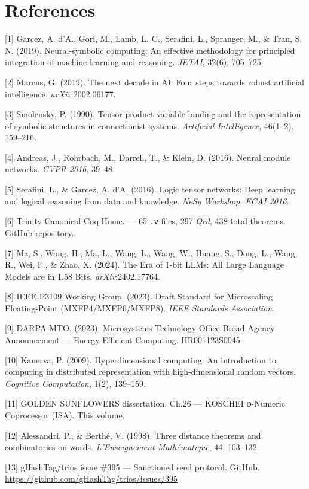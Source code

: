 \section{References}\label{fa_02:references}

[1] Garcez, A. d'A., Gori, M., Lamb, L. C.,
Serafini, L., Spranger, M., \& Tran, S. N. (2019).
Neural-symbolic computing: An effective
methodology for principled integration of machine
learning and reasoning. \emph{JETAI}, 32(6),
705--725.

[2] Marcus, G. (2019). The next decade in AI:
Four steps towards robust artificial intelligence.
\emph{arXiv}:2002.06177.

[3] Smolensky, P. (1990). Tensor product
variable binding and the representation of
symbolic structures in connectionist systems.
\emph{Artificial Intelligence}, 46(1--2),
159--216.

[4] Andreas, J., Rohrbach, M., Darrell, T., \&
Klein, D. (2016). Neural module networks.
\emph{CVPR 2016}, 39--48.

[5] Serafini, L., \& Garcez, A. d'A. (2016).
Logic tensor networks: Deep learning and logical
reasoning from data and knowledge. \emph{NeSy
Workshop, ECAI 2016}.

[6] Trinity Canonical Coq Home.
 --- 65
\texttt{.v} files, 297 \emph{Qed}, 438 total
theorems. GitHub repository.

[7] Ma, S., Wang, H., Ma, L., Wang, L., Wang,
W., Huang, S., Dong, L., Wang, R., Wei, F., \&
Zhao, X. (2024). The Era of 1-bit LLMs: All Large
Language Models are in 1.58 Bits.
\emph{arXiv}:2402.17764.

[8] IEEE P3109 Working Group. (2023). Draft
Standard for Microscaling Floating-Point
(MXFP4/MXFP6/MXFP8). \emph{IEEE Standards
Association}.

[9] DARPA MTO. (2023). Microsystems Technology
Office Broad Agency Announcement ---
Energy-Efficient Computing. HR001123S0045.

[10] Kanerva, P. (2009). Hyperdimensional
computing: An introduction to computing in
distributed representation with high-dimensional
random vectors. \emph{Cognitive Computation},
1(2), 139--159.

[11] GOLDEN SUNFLOWERS dissertation. Ch.26 ---
KOSCHEI φ-Numeric Coprocessor (ISA). This volume.

[12] Alessandri, P., \& Berthé, V. (1998).
Three distance theorems and combinatorics on
words. \emph{L'Enseignement Mathématique}, 44,
103--132.

[13] gHashTag/trios issue \#395 --- Sanctioned
seed protocol. GitHub.
\url{https://github.com/gHashTag/trios/issues/395}

